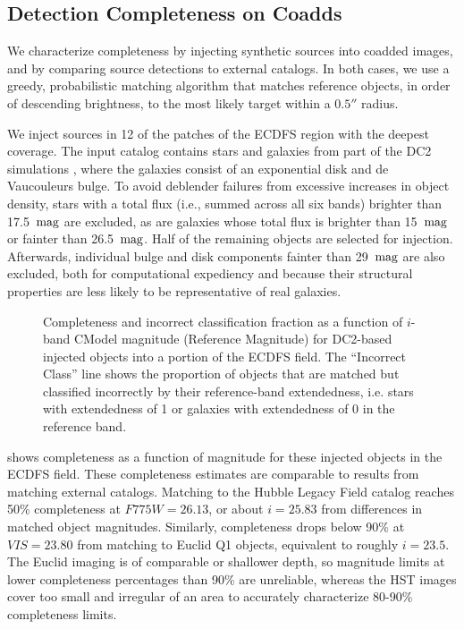 \subsection{Detection Completeness on Coadds}
\label{ssec:detection_completeness}
We characterize completeness by injecting synthetic sources into coadded images, and by comparing source detections to external catalogs.
In both cases, we use a greedy, probabilistic matching \gls{algorithm} that matches reference objects, in order of descending brightness, to the most likely target within a $0.5''$ radius.

We inject sources in 12 of the patches of the \gls{ECDFS} region with the deepest coverage.
The input catalog contains stars and galaxies from part of the \gls{DC2} simulations \citep{2021ApJS..253...31L}, where the galaxies consist of an exponential disk and de Vaucouleurs \citep{1948AnAp...11..247D,1953MNRAS.113..134D} bulge.
To avoid deblender failures from excessive increases in object density, stars with a total \gls{flux} (i.e., summed across all six bands) brighter than 17.5~${\rm mag}$ are excluded, as are galaxies whose total \gls{flux} is brighter than 15~${\rm mag}$ or fainter than 26.5~${\rm mag}$.
Half of the remaining objects are selected for injection.
Afterwards, individual bulge and disk components fainter than 29~${\rm mag}$ are also excluded, both for computational expediency and because their structural properties are less likely to be representative of real galaxies.
\begin{figure}[htb]
\caption{Completeness and incorrect classification fraction as a function of $i$-band CModel magnitude (Reference Magnitude) for DC2-based injected objects into a portion of the ECDFS field. 
The ``Incorrect Class'' line shows the proportion of objects that are matched but classified incorrectly by their reference-band extendedness, i.e. stars with extendedness of 1 or galaxies with extendedness of 0 in the reference band.}
\label{fig:injected_lsst_cells_v1_5063_i_completeness_any}
\end{figure}

 shows completeness as a function of magnitude for these injected objects in the \gls{ECDFS} field.
These completeness estimates are comparable to results from matching external catalogs. 
Matching to the Hubble Legacy Field catalog \citep{2016arXiv160600841I, 2019ApJS..244...16W} reaches 50\% completeness at $F775W=26.13$, or about $i=25.83$ from differences in matched object magnitudes.
Similarly, completeness drops below 90\% at $VIS=23.80$ from matching to Euclid Q1 \citep{2025arXiv250315305E} objects, equivalent to roughly $i=23.5$. 
The Euclid imaging is of comparable or shallower depth, so magnitude limits at lower completeness percentages than 90\% are unreliable, whereas the HST images cover too small and irregular of an area to accurately characterize 80-90\% completeness limits.

